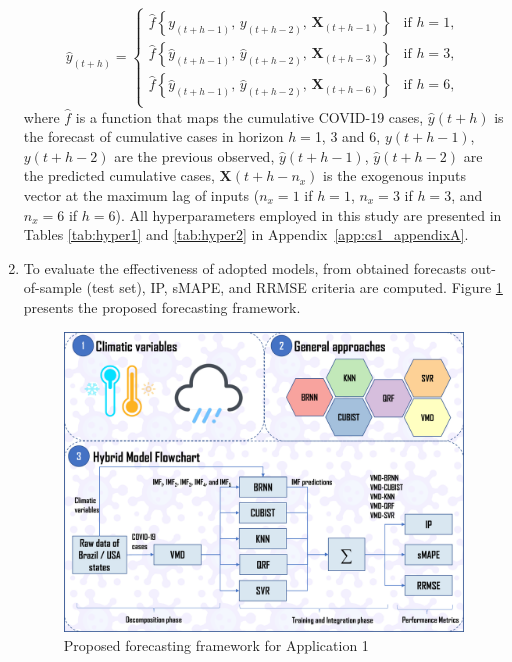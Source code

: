 \begin{enumerate}[start=1,label={\textbf{Step \arabic*:}},wide = 0pt, leftmargin = 3em]
\begin{equation}
    \hat{y}_{(t+h)} =
    \begin{cases}
    \hat{f}\left\{y_{(t+h-1)}, \,y_{(t+h-2)},\,\mathbf{X}_{(t+h-1)}\right\} & \text{if } h = 1, \\
    \hat{f}\left\{\hat{y}_{(t+h-1)},\,\hat{y}_{(t+h-2)},\, \mathbf{X}_{(t+h-3)}\right\} & \text{if } h = 3, \\
    \hat{f}\left\{\hat{y}_{(t+h-1)},\, \hat{y}_{(t+h-2)},\, \mathbf{X}_{(t+h-6)}\right\} & \text{if } h = 6, \\
    \end{cases}
\end{equation}
where $\hat{f}$ is a function that maps the cumulative \ac{COVID-19} cases, $\hat{y}(t+h)$ is the forecast of cumulative cases in horizon $h=$1, 3 and 6, $y(t+h-1)$, ${y}(t+h-2)$ are the previous observed, $\hat{y}(t+h-1)$, $\hat{y}(t+h-2)$ are the predicted cumulative cases, $\mathbf{X}(t+h-n_x)$ is the exogenous inputs vector at the maximum lag of inputs ($n_x = 1$ if $h = 1$, $n_x = 3$ if $h = 3$, and $n_x = 6$ if $h = 6$). All hyperparameters employed in this study are presented in Tables \ref{tab:hyper1} and \ref{tab:hyper2} in Appendix~\ref{app:cs1_appendixA}.  

\item To evaluate the effectiveness of adopted models, from obtained forecasts out-of-sample (test set), \ac{IP}, \ac{sMAPE}, and \ac{RRMSE} criteria are computed. Figure \ref{fig:flowchart} presents the proposed forecasting framework.

\begin{figure}[htb!]
    \centering
    \includegraphics[width=0.9\linewidth]{Media/cs1_framework.pdf}
    \caption{Proposed forecasting framework for Application 1}
    \label{fig:flowchart}
\end{figure}

\end{enumerate}